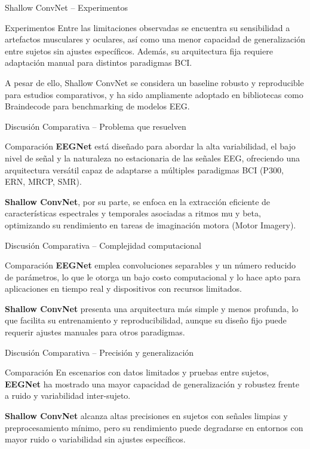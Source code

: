 \documentclass{beamer}
\begin{document}
\begin{frame}{Shallow ConvNet – Experimentos}
\begin{block}{Experimentos}
Entre las limitaciones observadas se encuentra su sensibilidad a artefactos musculares y oculares, así como una menor capacidad de generalización entre sujetos sin ajustes específicos. Además, su arquitectura fija requiere adaptación manual para distintos paradigmas BCI.

A pesar de ello, Shallow ConvNet se considera un baseline robusto y reproducible para estudios comparativos, y ha sido ampliamente adoptado en bibliotecas como Braindecode para benchmarking de modelos EEG.
\end{block}
\end{frame}


\begin{frame}{Discusión Comparativa – Problema que resuelven}
\begin{block}{Comparación}
\textbf{EEGNet} está diseñado para abordar la alta variabilidad, el bajo nivel de señal y la naturaleza no estacionaria de las señales EEG, ofreciendo una arquitectura versátil capaz de adaptarse a múltiples paradigmas BCI (P300, ERN, MRCP, SMR).  

\textbf{Shallow ConvNet}, por su parte, se enfoca en la extracción eficiente de características espectrales y temporales asociadas a ritmos mu y beta, optimizando su rendimiento en tareas de imaginación motora (Motor Imagery).
\end{block}
\end{frame}

\begin{frame}{Discusión Comparativa – Complejidad computacional}
\begin{block}{Comparación}
\textbf{EEGNet} emplea convoluciones separables y un número reducido de parámetros, lo que le otorga un bajo costo computacional y lo hace apto para aplicaciones en tiempo real y dispositivos con recursos limitados.  

\textbf{Shallow ConvNet} presenta una arquitectura más simple y menos profunda, lo que facilita su entrenamiento y reproducibilidad, aunque su diseño fijo puede requerir ajustes manuales para otros paradigmas.
\end{block}
\end{frame}

\begin{frame}{Discusión Comparativa – Precisión y generalización}
\begin{block}{Comparación}
En escenarios con datos limitados y pruebas entre sujetos, \textbf{EEGNet} ha mostrado una mayor capacidad de generalización y robustez frente a ruido y variabilidad inter-sujeto.  

\textbf{Shallow ConvNet} alcanza altas precisiones en sujetos con señales limpias y preprocesamiento mínimo, pero su rendimiento puede degradarse en entornos con mayor ruido o variabilidad sin ajustes específicos.
\end{block}
\end{frame}
\end{document}
